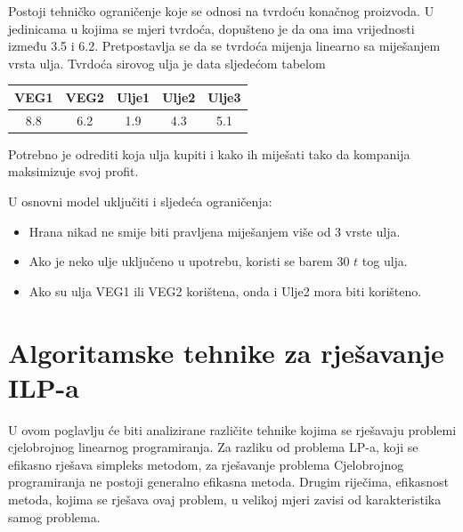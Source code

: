 \documentclass[a4paper, utf8, 11pt, colorlinks]{book}
\theoremstyle{definition}
\begin{document}
\begin{enumerate}
Postoji tehničko ograničenje koje se odnosi na tvrdoću konačnog proizvoda. U jedinicama u kojima se mjeri tvrdoća, dopušteno je da ona ima vrijednosti između 3.5 i 6.2. Pretpostavlja se da se tvrdoća mijenja %
 linearno sa miješanjem vrsta ulja. Tvrdoća sirovog ulja je data sljedećom tabelom
\begin{table}[H]
	\centering
	\begin{tabular}{ccccc}
		    VEG1 & VEG2 & Ulje1 & Ulje2 & Ulje3 \\ \hline
		    8.8  & 6.2  & 1.9   & 4.3   & 5.1   \\
    \end{tabular} 
\end{table}

Potrebno je odrediti koja ulja kupiti i kako ih miješati  tako da kompanija maksimizuje svoj profit. 

U osnovni model uključiti i sljedeća ograničenja:
\begin{itemize}
	\item Hrana nikad ne smije biti  pravljena miješanjem više od 3 vrste ulja. 
	\item Ako je neko ulje uključeno u upotrebu,  koristi se barem 30 $t$ tog ulja.
	\item Ako su ulja VEG1 ili VEG2  korištena, onda i Ulje2 mora biti korišteno.  
\end{itemize}

\end{enumerate}                                                       


 \chapter{Algoritamske tehnike za rješavanje ILP-a}\label{chap:rjesavanjeILP}
 
 U ovom poglavlju će biti analizirane različite tehnike kojima se rješavaju problemi cjelobrojnog linearnog programiranja.
 Za razliku od problema LP-a, koji se efikasno rješava simpleks metodom, za rješavanje problema Cjelobrojnog programiranja ne postoji generalno efikasna metoda. Drugim riječima, efikasnost metoda, kojima se rješava ovaj problem, u velikoj mjeri zavisi od karakteristika samog problema. 
 
\end{document}
